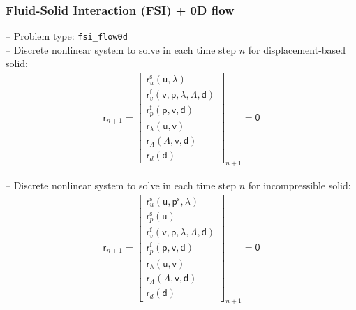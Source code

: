\documentclass[a4paper,12pt]{report}
\newcommand{\bs}[1]{\boldsymbol{#1}}
\newcommand{\ROP}{\bs{\mathsf{r}}}
\newcommand{\LM}{\bs{\mathsf{\lambda}}}
\newcommand{\LMZ}{\bs{\mathsf{\Lambda}}}
\begin{document}
\subsubsection{Fluid-Solid Interaction (FSI) + 0D flow}\label{fluid-solid-interaction-fsi-0d-flow}

-- Problem type: \verb"fsi_flow0d"\\

-- Discrete nonlinear system to solve in each time step $n$ for displacement-based solid:
\begin{equation}
\label{equation-nonlin-sys-fsi-0d}
\begin{aligned}
\ROP_{n+1} = \begin{bmatrix} \ROP_{u}^{\mathrm{s}}(\bs{\mathsf{u}},\LM) \\ \ROP_{v}^{\mathrm{f}}(\bs{\mathsf{v}},\bs{\mathsf{p}},\LM,\LMZ,\bs{\mathsf{d}}) \\ \ROP_{p}^{\mathrm{f}}(\bs{\mathsf{p}},\bs{\mathsf{v}},\bs{\mathsf{d}}) \\ \ROP_{\lambda}(\bs{\mathsf{u}},\bs{\mathsf{v}}) \\ \ROP_{\mathit{\Lambda}}(\LMZ,\bs{\mathsf{v}},\bs{\mathsf{d}}) \\ \ROP_{d}(\bs{\mathsf{d}}) \end{bmatrix}_{n+1} = \bs{\mathsf{0}}
\end{aligned}
\end{equation}

-- Discrete nonlinear system to solve in each time step $n$ for incompressible solid:
\begin{equation}
\label{equation-nonlin-sys-fsi-0d-inc}
\begin{aligned}
\ROP_{n+1} = \begin{bmatrix} \ROP_{u}^{\mathrm{s}}(\bs{\mathsf{u}},\bs{\mathsf{p}}^{\mathrm{s}},\LM) \\ \ROP_{p}^{\mathrm{s}}(\bs{\mathsf{u}}) \\ \ROP_{v}^{\mathrm{f}}(\bs{\mathsf{v}},\bs{\mathsf{p}},\LM,\LMZ,\bs{\mathsf{d}}) \\ \ROP_{p}^{\mathrm{f}}(\bs{\mathsf{p}},\bs{\mathsf{v}},\bs{\mathsf{d}}) \\ \ROP_{\lambda}(\bs{\mathsf{u}},\bs{\mathsf{v}}) \\ \ROP_{\mathit{\Lambda}}(\LMZ,\bs{\mathsf{v}},\bs{\mathsf{d}}) \\ \ROP_{d}(\bs{\mathsf{d}}) \end{bmatrix}_{n+1} = \bs{\mathsf{0}}
\end{aligned}
\end{equation}
\end{document}
